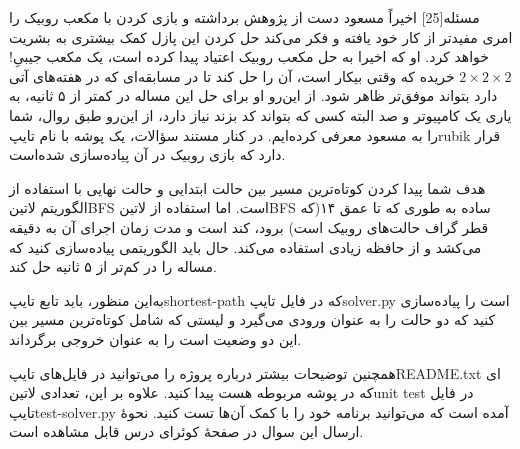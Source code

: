 ‌مسئله[25]
اخیراً مسعود دست از پژوهش برداشته و بازی کردن با مکعب روبیک را امری مفیدتر از کار خود یافته و فکر می‌کند حل کردن این پازل کمک بیشتری به بشریت خواهد کرد. او که اخیرا به حل مکعب روبیک اعتیاد پیدا کرده است، یک مکعب جیبیِ! 
$2 \times 2 \times 2$
خریده که وقتی بیکار است، آن را حل کند تا در مسابقه‌ای که در هفته‌های آتی دارد بتواند موفق‌تر ظاهر شود.
از این‌رو او برای حل این مساله در کمتر از ۵ ثانیه، به یاری یک کامپیوتر و صد البته کسی که بتواند کد بزند نیاز دارد، از این‌رو طبق روال، شما را به مسعود معرفی کرده‌ایم.
در کنار مستند سؤالات، یک پوشه با نام ‌تایپ{rubik} قرار دارد که بازی روبیک در آن پیاده‌سازی شده‌است.

هدف شما پیدا کردن کوتاه‌ترین مسیر بین حالت ابتدایی و حالت نهایی با استفاده از  الگوریتم ‌لاتین{BFS} است. اما استفاده از ‌لاتین{BFS} ساده به طوری که تا عمق ۱۴(که قطر گراف حالت‌های روبیک است) برود، کند است و مدت زمان اجرای آن به دقیقه می‌کشد و از حافظه زیادی استفاده می‌کند. حال باید الگوریتمی پیاده‌سازی کنید که مساله را در کم‌تر از ۵ ثانیه حل کند.

به‌این منظور، باید تابع ‌تایپ{shortest-path} که در فایل ‌تایپ{solver.py} است را  پیاده‌سازی کنید که دو حالت را به عنوان ورودی می‌گیرد و لیستی که شامل کوتاه‌ترین مسیر بین این دو وضعیت است را به عنوان خروجی برگرداند.

همچنین توضیحات بیشتر درباره پروژه را می‌توانید در فایل‌های ‌تایپ{README.txt} ای که در پوشه مربوطه هست پیدا کنید. علاوه بر این، تعدادی ‌لاتین{unit test} در فایل ‌تایپ{test-solver.py} آمده است که می‌توانید برنامه خود را با کمک آن‌ها تست کنید. نحوۀ ارسال این سوال در صفحۀ کوئرای درس قابل مشاهده است.








